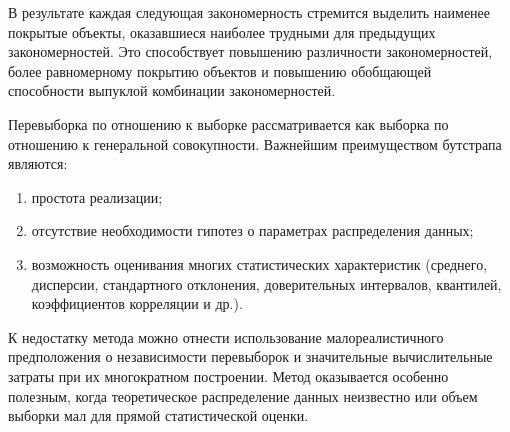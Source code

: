 В результате каждая следующая закономерность стремится выделить наименее покрытые объекты, оказавшиеся наиболее трудными для предыдущих закономерностей. Это способствует повышению различности закономерностей, более равномерному покрытию объектов и повышению
обобщающей способности выпуклой комбинации закономерностей.

Перевыборка по отношению к выборке рассматривается как выборка по отношению к генеральной совокупности.
Важнейшим преимуществом бутстрапа являются:  
\begin{enumerate}
	\item простота реализации;  
	\item отсутствие необходимости гипотез о параметрах распределения данных;   
	\item возможность оценивания многих статистических характеристик (среднего, дисперсии, стандартного отклонения, доверительных интервалов, квантилей, коэффициентов корреляции и др.). 
\end{enumerate}

К недостатку метода можно отнести использование малореалистичного предположения о независимости перевыборок и значительные вычислительные затраты при их многократном построении. Метод оказывается особенно полезным, когда теоретическое распределение данных неизвестно или объем выборки мал для прямой статистической оценки.

\clearpage
